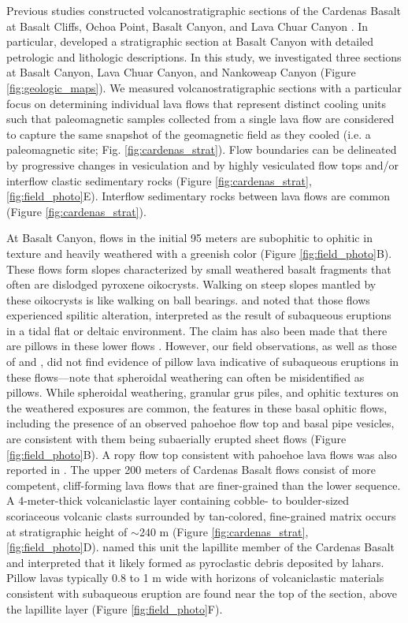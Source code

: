 Previous studies constructed volcanostratigraphic sections of the Cardenas Basalt at Basalt Cliffs, Ochoa Point, Basalt Canyon, and Lava Chuar Canyon \cite{Lucchitta1983a, Hendricks1989a}. In particular,  developed a stratigraphic section at Basalt Canyon with detailed petrologic and lithologic descriptions. In this study, we investigated three sections at Basalt Canyon, Lava Chuar Canyon, and Nankoweap Canyon (Figure \ref{fig:geologic_maps}). We measured volcanostratigraphic sections with a particular focus on determining individual lava flows that represent distinct cooling units such that paleomagnetic samples collected from a single lava flow are considered to capture the same snapshot of the geomagnetic field as they cooled (i.e. a paleomagnetic site; Fig. \ref{fig:cardenas_strat}). Flow boundaries can be delineated by progressive changes in vesiculation and by highly vesiculated flow tops and/or interflow clastic sedimentary rocks (Figure \ref{fig:cardenas_strat}, \ref{fig:field_photo}E). Interflow sedimentary rocks between lava flows are common (Figure \ref{fig:cardenas_strat}).

At Basalt Canyon, flows in the initial 95 meters are subophitic to ophitic in texture and heavily weathered with a greenish color (Figure \ref{fig:field_photo}B). These flows form slopes characterized by small weathered basalt fragments that often are dislodged pyroxene oikocrysts. Walking on steep slopes mantled by these oikocrysts is like walking on ball bearings.  and  noted that those flows experienced spilitic alteration, interpreted as the result of subaqueous eruptions in a tidal flat or deltaic environment. The claim has also been made that there are pillows in these lower flows \cite{Stevenson1982a, Hendricks1974a}. However, our field observations, as well as those of  and , did not find evidence of pillow lava indicative of subaqueous eruptions in these flows---note that spheroidal weathering can often be misidentified as pillows. While spheroidal weathering, granular grus piles, and ophitic textures on the weathered exposures are common, the features in these basal ophitic flows, including the presence of an observed pahoehoe flow top and basal pipe vesicles, are consistent with them being subaerially erupted sheet flows (Figure \ref{fig:field_photo}B). A ropy flow top consistent with pahoehoe lava flows was also reported in . The upper 200 meters of Cardenas Basalt flows consist of more competent, cliff-forming lava flows that are finer-grained than the lower sequence. A 4-meter-thick volcaniclastic layer containing cobble- to boulder-sized scoriaceous volcanic clasts surrounded by tan-colored, fine-grained matrix occurs at stratigraphic height of $\sim$240 m (Figure \ref{fig:cardenas_strat}, \ref{fig:field_photo}D).  named this unit the lapillite member of the Cardenas Basalt and interpreted that it likely formed as pyroclastic debris deposited by lahars. Pillow lavas typically 0.8 to 1 m wide with horizons of volcaniclastic materials consistent with subaqueous eruption are found near the top of the section, above the lapillite layer (Figure \ref{fig:field_photo}F). 

